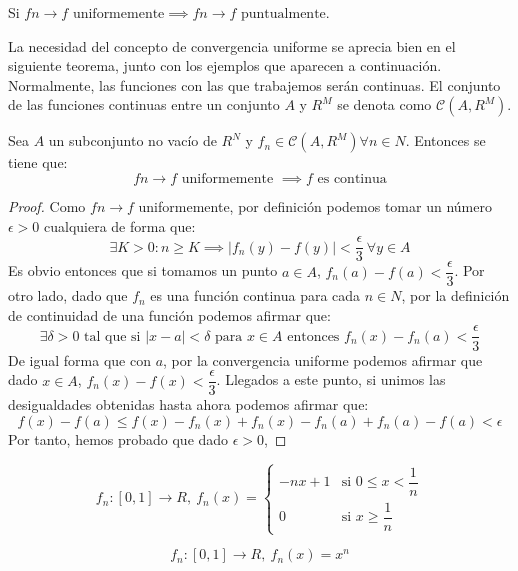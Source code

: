 \begin{nprop} \label{unif_puntual}
  Si $fn\to f \text{ uniformemente} \implies fn \to f \text{ puntualmente}$.
\end{nprop}

  La necesidad del concepto de convergencia uniforme se aprecia bien
  en el siguiente teorema, junto con los ejemplos que aparecen a
  continuación. Normalmente, las funciones con las que trabajemos
  serán continuas. El conjunto de las funciones continuas entre un
  conjunto $A$ y $R^M$ se denota como $\mathcal{C}(A,R^M)$.

\begin{nth}
  \label{2}
  Sea $A$ un subconjunto no vacío de  $R^N$ y $f_n \in \mathcal{C} (A,R^M) \forall n\in N$. Entonces se tiene que:
  \[
    fn \to f \text{ uniformemente } \implies f \text{ es continua}
  \]
\end{nth}

\begin{proof}
  Como $fn \to f$ uniformemente, por definición podemos tomar un número $\epsilon > 0$ cualquiera de forma que:
  \[ \exists K>0: 
  n 
  \geq K 
  \implies 
  |f_n(y)-f(y)|<
  \dfrac{\epsilon}{3}\ 
  \forall y\in A \]
    Es obvio entonces que si tomamos un punto $a \in A$, $f_n(a)-f(a)<\dfrac{\epsilon}{3}$. Por otro lado, dado que $f_n$ es una función continua para cada $n \in N$, por la definición de continuidad de una función podemos afirmar que:
    $$\exists \delta > 0 \text{ tal que si } |x-a| < \delta \text{ para } x \in A \text{ entonces } f_n(x)-f_n(a) < \dfrac{\epsilon}{3}$$
    De igual forma que con $a$, por la convergencia uniforme podemos afirmar que dado $x \in A$, $f_n(x)-f(x)<\dfrac{\epsilon}{3}$.
    Llegados a este punto, si unimos las desigualdades obtenidas hasta ahora podemos afirmar que:
    $$ f(x)-f(a) \le f(x)-f_n(x) + f_n(x)-f_n(a)+f_n(a)-f(a) < \epsilon $$
  Por tanto, hemos probado que dado $\epsilon > 0$,
\end{proof}

\begin{ejemplo} \label{ex:sucesion1}
  \[
    f_n : [0,1] \to R,\ f_n(x) = \begin{cases}
    -nx+1 & \text{si }  0\le x < \dfrac{1}{n}\\
    0     & \text{si }  x\ge \dfrac{1}{n}
    \end{cases}
  \]
\end{ejemplo}

\begin{ejemplo}
  \[
    f_n : [0,1] \to R,\ f_n(x) = x^n
  \]
\end{ejemplo}

